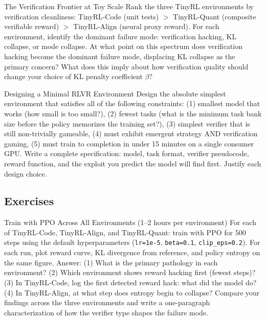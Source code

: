\begin{thinkfirst}{The Verification Frontier at Toy Scale}
Rank the three TinyRL environments by verification cleanliness: TinyRL-Code (unit tests) $>$ TinyRL-Quant (composite verifiable reward) $>$ TinyRL-Align (neural proxy reward). For each environment, identify the dominant failure mode: verification hacking, KL collapse, or mode collapse. At what point on this spectrum does verification hacking become the dominant failure mode, displacing KL collapse as the primary concern? What does this imply about how verification quality should change your choice of KL penalty coefficient $\beta$?
\end{thinkfirst}

\begin{thinkfirst}{Designing a Minimal RLVR Environment}
Design the absolute simplest environment that satisfies all of the following constraints: (1) smallest model that works (how small is too small?), (2) fewest tasks (what is the minimum task bank size before the policy memorizes the training set?), (3) simplest verifier that is still non-trivially gameable, (4) must exhibit emergent strategy AND verification gaming, (5) must train to completion in under 15 minutes on a single consumer GPU. Write a complete specification: model, task format, verifier pseudocode, reward function, and the exploit you predict the model will find first. Justify each design choice.
\end{thinkfirst}

\subsection{Exercises}

\begin{exercise}{Train with PPO Across All Environments (1--2 hours per environment)}
For each of TinyRL-Code, TinyRL-Align, and TinyRL-Quant: train with PPO for 500 steps using the default hyperparameters (\texttt{lr=1e-5}, \texttt{beta=0.1}, \texttt{clip\_eps=0.2}). For each run, plot reward curve, KL divergence from reference, and policy entropy on the same figure. Answer: (1) What is the primary pathology in each environment? (2) Which environment shows reward hacking first (fewest steps)? (3) In TinyRL-Code, log the first detected reward hack: what did the model do? (4) In TinyRL-Align, at what step does entropy begin to collapse? Compare your findings across the three environments and write a one-paragraph characterization of how the verifier type shapes the failure mode.
\end{exercise}

